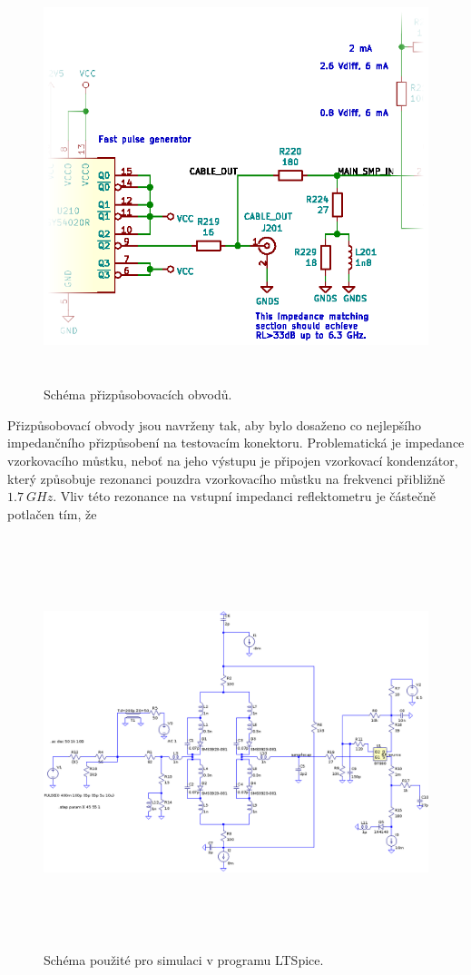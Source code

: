 \begin{figure}[htbp]
\includegraphics[width=\textwidth,height=12cm,keepaspectratio]{images/match_section.eps}\caption{Schéma přizpůsobovacích obvodů.}\label{match_section_schematic}
\end{figure}

Přizpůsobovací obvody jsou navrženy tak, aby bylo dosaženo co nejlepšího impedančního přizpůsobení na testovacím konektoru. Problematická je impedance vzorkovacího můstku, neboť na jeho výstupu je připojen vzorkovací kondenzátor, který způsobuje rezonanci pouzdra vzorkovacího můstku na frekvenci přibližně $1.7~\si{GHz}$. Vliv této rezonance na vstupní impedanci reflektometru je částečně potlačen tím, že 

\begin{figure}[htbp]
\includegraphics[width=\textwidth,height=12cm,keepaspectratio]{images/ltspice_schematic.eps}\caption{Schéma použité pro simulaci v programu LTSpice.}\label{ltspice_schematic}
\end{figure}

